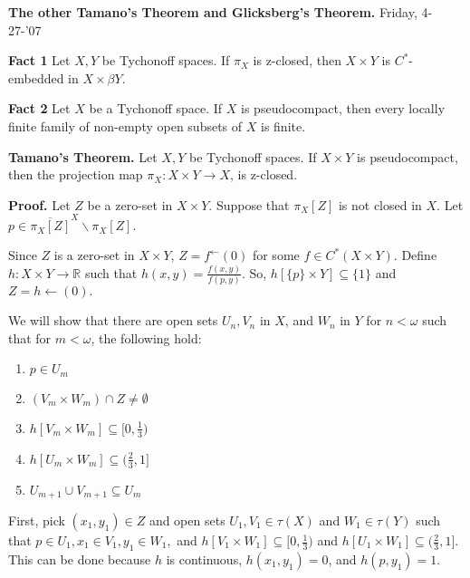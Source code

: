 \documentclass{article}
\begin{document}
\begin{center}
\textbf{The other Tamano's Theorem and Glicksberg's Theorem.}
\vskip 15pt
Friday, 4-27-'07
\end{center}

\vskip 25pt

\textbf{Fact 1} Let $X,Y$ be Tychonoff spaces. If $\pi_X$ is z-closed, then $X\times Y$ is $C^*$-embedded in $X\times \beta Y$.

\vskip 20pt

\textbf{Fact 2} Let $X$ be a Tychonoff space. If $X$ is pseudocompact, then every locally finite family of non-empty open subsets of $X$ is finite.


\vskip 35pt











\textbf{Tamano's Theorem.} Let $X, Y$ be Tychonoff spaces. If $X\times Y$ is pseudocompact, then the projection map $\pi_X: X\times Y\rightarrow X$, is z-closed. 

\vskip 20pt

\textbf{Proof.} Let $Z$ be a zero-set in $X\times Y$. Suppose that $\pi_X[Z]$ is not closed in $X$. Let $p\in \overline{\pi_X[Z]}^X\backslash \pi_X[Z].$ 

\vskip 15pt

Since $Z$ is a zero-set in $X\times Y$, $Z=f^\leftarrow (0)$ for some $f\in C^*(X\times Y).$ Define $h: X\times Y\rightarrow \mathbb{R}$ such that $h(x,y)=\frac{f(x,y)}{f(p,y)}$. So, $h\left[\{p\}\times Y\right] \subseteq \{1\}$ and $Z=h\leftarrow (0).$ 
\vskip 10pt

We will show that there are open sets $U_n, V_n$ in $X$, and $W_n$ in $Y$ for $n<\omega$ such that for $m<\omega$, the following hold: 

\begin{enumerate}
	\item $p\in U_m$
	\item $(V_m\times W_m)\cap Z \neq \emptyset$
	\item $h\left[V_m\times W_m\right] \subseteq [0,\frac{1}{3})$
	\item $h\left[U_m\times W_m\right] \subseteq (\frac{2}{3},1]$
	\item $U_{m+1}\cup V_{m+1}\subseteq U_m$
\end{enumerate}

\vskip 5pt

First, pick $(x_1,y_1)\in Z$ and open sets $U_1,V_1\in \tau(X)$ and $W_1\in \tau(Y)$ such that $p\in U_1, x_1\in V_1, y_1\in W_1,$ and $h\left[V_1\times W_1\right] \subseteq [0,\frac{1}{3})$ and $h\left[U_1\times W_1\right] \subseteq (\frac{2}{3}, 1]$. This can be done because $h$ is continuous, $h(x_1,y_1)=0$, and $h(p,y_1)=1$.
\end{document}
